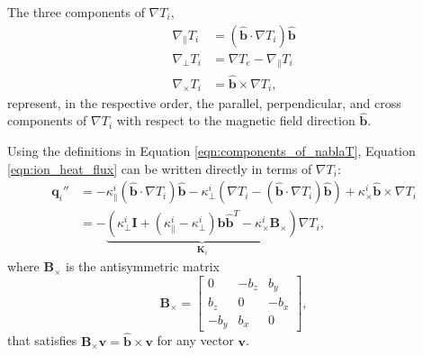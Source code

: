 The three components of $\nabla T_i$,
\begin{subequations}
    \label{eqn:components_of_nablaT}
    \begin{align}
        \nabla_\parallel T_i &= (\mathbf{\hat{b}} \cdot \nabla T_i) \mathbf{\hat{b}} \\
        \nabla_\perp T_i &= \nabla T_e - \nabla_\parallel T_i \\
        \nabla_\times T_i &= \mathbf{\hat{b}} \times \nabla T_i,
    \end{align}
\end{subequations}
represent, in the respective order, the parallel, perpendicular, and cross components of $\nabla T_i$ with respect to the magnetic field direction $\mathbf{\hat{b}}$.

Using the definitions in Equation \ref{eqn:components_of_nablaT}, Equation \ref{eqn:ion_heat_flux} can be written directly in terms of $\nabla T_i$:
\begin{subequations}
    \label{eqn:electron_conduction_cartesian}
    \begin{align}
        \mathbf{q}_i'' &= -\kappa^i_\parallel (\mathbf{\hat{b}} \cdot \nabla T_i) \mathbf{\hat{b}} - \kappa^i_\perp (\nabla T_i - (\mathbf{\hat{b}} \cdot \nabla T_i) \mathbf{\hat{b}}) + \kappa^i_\times \mathbf{\hat{b}} \times \nabla T_i \\
        &= - \underbrace{\left( \kappa^i_\perp \mathbf{I} + (\kappa^i_\parallel - \kappa^i_\perp) \mathbf{\hat{b}}\mathbf{\hat{b}}^T - \kappa^i_\times \mathbf{B}_\times \right)}_{\mathbf{K}_i} \nabla T_i,
    \end{align}
\end{subequations}
where $\mathbf{B}_\times$ is the antisymmetric matrix
\begin{equation}
    \mathbf{B}_\times =
    \begin{bmatrix}
        0 & -b_z & b_y \\
        b_z & 0 & -b_x \\
        -b_y & b_x & 0
    \end{bmatrix},
\end{equation}
that satisfies $\mathbf{B}_\times \mathbf{v} = \mathbf{\hat{b}} \times \mathbf{v}$ for any vector $\mathbf{v}$.

